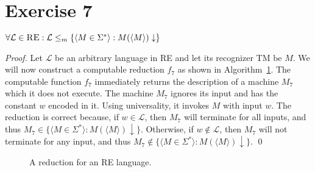 \documentclass[11pt]{llncs}
\begin{document}
\section*{Exercise 7}
\begin{lemma}
$\forall \mathcal{L} \in \textsc{RE}:
\mathcal{L} \leq_m
\{\langle M \in \Sigma^* \rangle: M(\langle M \rangle)\downarrow\}$
\end{lemma}
\begin{proof}
Let $\mathcal{L}$ be an arbitrary language in \textsc{RE} and let its recognizer
TM be $M$. We will now construct a computable reduction $f_7$ as shown in
Algorithm~\ref{alg.ex7}. The computable function $f_7$ immediately returns the
description of a machine $M_7$ which it does not execute. The machine $M_7$
ignores its input and has
the constant $w$ encoded in it. Using universality, it invokes $M$ with input
$w$. The reduction is correct because, if $w \in \mathcal{L}$, then $M_7$ will
terminate for all inputs, and thus
$M_7 \in \{\langle M \in \Sigma^* \rangle:
M(\langle M \rangle)\downarrow\}$. Otherwise, if $w \not \in \mathcal{L}$, then
$M_7$ will not terminate for any input, and thus
$M_7 \not \in \{\langle M \in \Sigma^* \rangle: M(\langle M
\rangle)\downarrow\}$.
\qed
\end{proof}

\begin{figure}[t]
\begin{algorithm}[H]
  \caption{\label{alg.ex7}
      A reduction for an \textsc{RE} language.
  }
  \begin{algorithmic}[1]
        \State{}
              \State{}
          \Else
              \State{}
          \EndIf
        \EndFunction
      \EndFunction
  \end{algorithmic}
\end{algorithm}
\end{figure}
\end{document}

